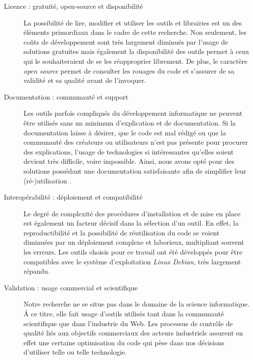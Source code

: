     \begin{description}
        \item[Licence : gratuité, open-source et disponibilité]
            La possibilité de lire, modifier et utiliser les outils et librairies est un des éléments primordiaux dans le cadre de cette recherche. Non seulement, les coûts de développement sont très largement diminués par l'usage de solutions gratuites mais également la disponibilité des outils permet à ceux qui le souhaiteraient de se les réapproprier librement. De plus, le caractère \textit{open source} permet de consulter les rouages du code et s'assurer de sa validité et sa qualité avant de l'invoquer.

        \item[Documentation : communauté et support]
            Les outils parfois compliqués du développement informatique ne peuvent être utilisés sans un minimum d'explication et de documentation. Si la documentation laisse à désirer, que le code est mal rédigé ou que la communauté des créateurs ou utilisateurs n'est pas présente pour procurer des explications, l'usage de technologies si intéressantes qu'elles soient devient très difficile, voire impossible. Ainsi, nous avons opté pour des solutions possédant une documentation satisfaisante afin de simplifier leur (ré-)utilisation .

        \item[Interopérabilité : déploiement et compatibilité]
            Le degré de complexité des procédures d'installation et de mise en place est également un facteur décisif dans la sélection d'un outil. En effet, la reproductibilité et la possibilité de réutilisation du code se voient diminuées par un déploiement complexe et laborieux, multipliant souvent les erreurs. Les outils choisis pour ce travail ont été développés pour être compatibles avec le système d'exploitation \textit{Linux Debian}, très largement répandu.

        \item[Validation : usage commercial et scientifique]
            Notre recherche ne se situe pas dans le domaine de la science informatique. \'A ce titre, elle fait usage d'outils utilisés tant dans la communauté scientifique que dans l'industrie du Web. Les processus de contrôle de qualité liés aux objectifs commerciaux des acteurs industriels assurent en effet une certaine optimisation du code qui pèse dans nos décisions d'utiliser telle ou telle technologie.
    \end{description}

